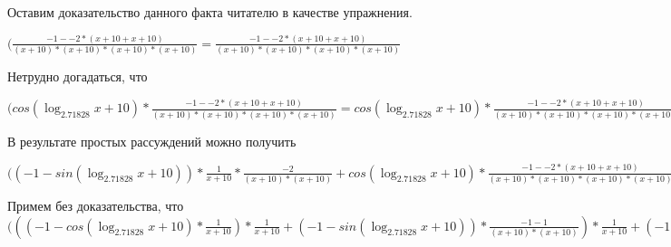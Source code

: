 \documentclass[12pt,a4paper,fleqn]{article}
\theoremstyle{definition}
\begin{document}
Оставим доказательство данного факта читателю в качестве упражнения.

$(\frac{ -1  -  -2  * ( x  +  10  +  x  +  10 )}{( x  +  10 ) * ( x  +  10 ) * ( x  +  10 ) * ( x  +  10 )}
 = \frac{ -1  -  -2  * ( x  +  10  +  x  +  10 )}{( x  +  10 ) * ( x  +  10 ) * ( x  +  10 ) * ( x  +  10 )}
$

Нетрудно догадаться, что

$(cos(\log_{ 2.71828 }{ x  +  10 }) * \frac{ -1  -  -2  * ( x  +  10  +  x  +  10 )}{( x  +  10 ) * ( x  +  10 ) * ( x  +  10 ) * ( x  +  10 )}
 = cos(\log_{ 2.71828 }{ x  +  10 }) * \frac{ -1  -  -2  * ( x  +  10  +  x  +  10 )}{( x  +  10 ) * ( x  +  10 ) * ( x  +  10 ) * ( x  +  10 )}
$

В результате простых рассуждений можно получить

$(( -1  - sin(\log_{ 2.71828 }{ x  +  10 })) * \frac{ 1 }{ x  +  10 }
 * \frac{ -2 }{( x  +  10 ) * ( x  +  10 )}
 + cos(\log_{ 2.71828 }{ x  +  10 }) * \frac{ -1  -  -2  * ( x  +  10  +  x  +  10 )}{( x  +  10 ) * ( x  +  10 ) * ( x  +  10 ) * ( x  +  10 )}
 = ( -1  - sin(\log_{ 2.71828 }{ x  +  10 })) * \frac{ 1 }{ x  +  10 }
 * \frac{ -2 }{( x  +  10 ) * ( x  +  10 )}
 + cos(\log_{ 2.71828 }{ x  +  10 }) * \frac{ -1  -  -2  * ( x  +  10  +  x  +  10 )}{( x  +  10 ) * ( x  +  10 ) * ( x  +  10 ) * ( x  +  10 )}
$

Примем без доказательства, что
$((( -1  - cos(\log_{ 2.71828 }{ x  +  10 }) * \frac{ 1 }{ x  +  10 }
) * \frac{ 1 }{ x  +  10 }
 + ( -1  - sin(\log_{ 2.71828 }{ x  +  10 })) * \frac{ -1  -  1 }{( x  +  10 ) * ( x  +  10 )}
) * \frac{ 1 }{ x  +  10 }
 + ( -1  - sin(\log_{ 2.71828 }{ x  +  10 })) * \frac{ 1 }{ x  +  10 }
 * \frac{ -1  -  1 }{( x  +  10 ) * ( x  +  10 )}
 + ( -1  - sin(\log_{ 2.71828 }{ x  +  10 })) * \frac{ 1 }{ x  +  10 }
 * \frac{ -2 }{( x  +  10 ) * ( x  +  10 )}
 + cos(\log_{ 2.71828 }{ x  +  10 }) * \frac{ -1  -  -2  * ( x  +  10  +  x  +  10 )}{( x  +  10 ) * ( x  +  10 ) * ( x  +  10 ) * ( x  +  10 )}
 = (( -1  - cos(\log_{ 2.71828 }{ x  +  10 }) * \frac{ 1 }{ x  +  10 }
) * \frac{ 1 }{ x  +  10 }
 + ( -1  - sin(\log_{ 2.71828 }{ x  +  10 })) * \frac{ -1  -  1 }{( x  +  10 ) * ( x  +  10 )}
) * \frac{ 1 }{ x  +  10 }
 + ( -1  - sin(\log_{ 2.71828 }{ x  +  10 })) * \frac{ 1 }{ x  +  10 }
 * \frac{ -1  -  1 }{( x  +  10 ) * ( x  +  10 )}
 + ( -1  - sin(\log_{ 2.71828 }{ x  +  10 })) * \frac{ 1 }{ x  +  10 }
 * \frac{ -2 }{( x  +  10 ) * ( x  +  10 )}
 + cos(\log_{ 2.71828 }{ x  +  10 }) * \frac{ -1  -  -2  * ( x  +  10  +  x  +  10 )}{( x  +  10 ) * ( x  +  10 ) * ( x  +  10 ) * ( x  +  10 )}
$
\end{document}
